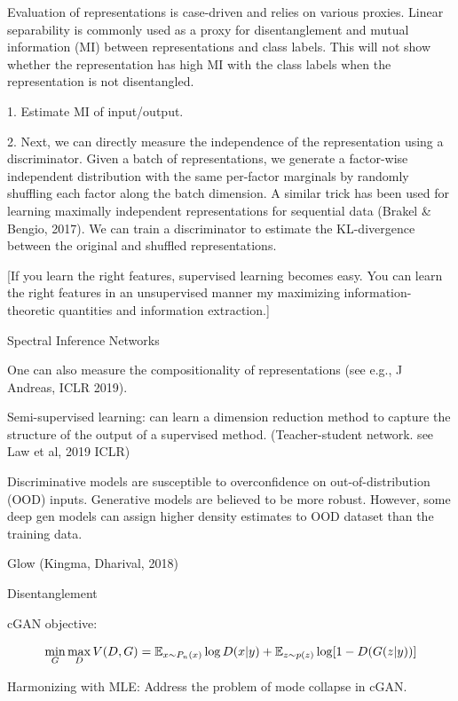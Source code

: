 \documentclass[english]{article}
\begin{document}
Evaluation of representations is case-driven and relies on various proxies. Linear separability is
commonly used as a proxy for disentanglement and mutual information (MI) between representations
and class labels.  This will not show whether the representation has high MI with
the class labels when the representation is not disentangled.


1. Estimate MI of input/output. 

2. Next, we can directly measure the independence of the representation using a discriminator. Given a
batch of representations, we generate a factor-wise independent distribution with the same per-factor
marginals by randomly shuffling each factor along the batch dimension. A similar trick has been used
for learning maximally independent representations for sequential data (Brakel \& Bengio, 2017). We
can train a discriminator to estimate the KL-divergence between the original and shuffled representations.


[If you learn the right features, supervised learning becomes easy. You can learn the right features in an unsupervised manner my maximizing information-theoretic quantities and information extraction.]

\item Spectral Inference Networks

One can also measure the compositionality of representations (see e.g., J Andreas, ICLR 2019).

\item Semi-supervised learning: can learn a dimension reduction method to capture the structure of the output of a supervised method. (Teacher-student network. see Law et al, 2019 ICLR)

\item Discriminative models are susceptible to overconfidence on out-of-distribution (OOD) inputs. Generative models are believed to be more robust. However, some deep gen models can assign higher density estimates to OOD dataset than the training data.

\item Glow (Kingma, Dharival, 2018)

Disentanglement
\eenum

cGAN objective: 

$$\min_G\max_D V(D,G) 
= \mathbb{E}_{x\sim P_n(x)}\log D(x|y) + 
\mathbb{E}_{z\sim p(z)} \log[1-D(G(z|y))] $$


\item 

Harmonizing with MLE: Address the problem of mode collapse in cGAN. 
\end{document}
